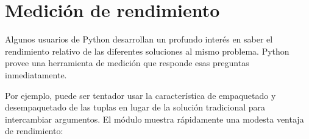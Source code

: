 \documentclass[a5paper,10pt,spanish]{sphinxmanual}
\begin{document}
\begin{sphinxVerbatim}[commandchars=\\\{\}]
 
  
  
\end{sphinxVerbatim}


\section{Medición de rendimiento}
\label{\detokenize{tutorial/stdlib:performance-measurement}}\label{\detokenize{tutorial/stdlib:tut-performance-measurement}}
\sphinxAtStartPar
Algunos usuarios de Python desarrollan un profundo interés en saber el rendimiento relativo de las diferentes soluciones al mismo problema.  Python provee una herramienta de medición que responde esas preguntas inmediatamente.

\sphinxAtStartPar
Por ejemplo, puede ser tentador usar la característica de empaquetado y desempaquetado de las tuplas en lugar de la solución tradicional para intercambiar argumentos.  El módulo  muestra rápidamente una modesta ventaja de rendimiento:

\begin{sphinxVerbatim}[commandchars=\\\{\}]
   
 
 
\end{sphinxVerbatim}
\end{document}
